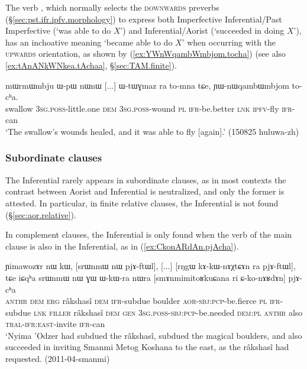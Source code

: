 The verb , which normally selects the \textsc{downwards} preverbs (§\ref{sec:pst.ifr.ipfv.morphology}) to express both Imperfective Inferential/Past Imperfective (`was able to do $X$') and Inferential/Aorist (`succeeded in doing $X$'), has an inchoative meaning `became able to do $X$' when occurring with the \textsc{upwards} orientation, as shown by (\ref{ex:YWnWqambWmbjom.tocha}) (see also \ref{ex:tAnANkWNkea.tAchaa}, §\ref{sec:TAM.finite}).

\largerpage
\begin{exe}
\ex \label{ex:YWnWqambWmbjom.tocha}
\gll mɯrmɯmbju ɯ-pɯ nɯnɯ [...] ɯ-tɯɣmaz ra to-mna tɕe, ɲɯ-nɯqambɯmbjom to-cʰa. \\
swallow \textsc{3sg}.\textsc{poss}-little.one \textsc{dem} { } \textsc{3sg}.\textsc{poss}-wound \textsc{pl} \textsc{ifr}-be.better \textsc{lnk} \textsc{ipfv}-fly \textsc{ifr}-can \\
\glt `The swallow's wounds healed, and it was able to fly [again].' (150825 huluwa-zh)
\end{exe}

\subsubsection{Subordinate clauses}  \label{sec:pst.ifr.subordinate}
The Inferential rarely appears in subordinate clauses, as in most contexts the contrast between Aorist and Inferential is neutralized, and only the former is attested. In particular, in finite relative clauses, the Inferential is not found (§\ref{sec:aor.relative}). 

In complement clauses, the Inferential is only found when the verb of the main clause is also in the Inferential, as in (\ref{ex:CkonARdAn.pjAcha}). 

 
\begin{exe}
\ex \label{ex:CkonARdAn.pjAcha}
 \gll  ɲimawozɤr nɯ kɯ, [srɯnmɯ nɯ pjɤ-ftɯl], [...] [rŋgɯ kɤ-kɯ-nɤχtɕɤn ra pjɤ-ftɯl],
tɕe iɕqʰa srɯnmɯ nɯ ɣɯ ɯ-kɯ-ra nɯra [smɤnmimitoʁkuɕana ri ɕ-ko-nɤʁdɤn] pjɤ-cʰa \\
\textsc{anthr} \textsc{dem} \textsc{erg} râkshasî \textsc{dem} \textsc{ifr}-subdue { } boulder \textsc{aor}-\textsc{sbj}:\textsc{pcp}-be.fierce \textsc{pl} \textsc{ifr}-subdue \textsc{lnk} \textsc{filler} râkshasî \textsc{dem} \textsc{gen} \textsc{3sg}.\textsc{poss}-\textsc{sbj}:\textsc{pcp}-be.needed \textsc{dem}:\textsc{pl}  \textsc{anthr} also \textsc{tral}-\textsc{ifr}:\textsc{east}-invite \textsc{ifr}-can \\
\glt `Nyima 'Odzer had subdued the râkshasî, subdued the magical boulders, and also succeeded in inviting Smanmi Metog Koshana to the east, as the râkshasî had requested. (2011-04-smanmi)
\end{exe}

